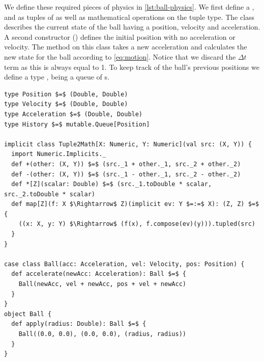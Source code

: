 We define these required pieces of physics in \autoref{lst:ball-physics}. We first define a ,  and  as tuples of  as well as mathematical operations on the tuple type. The  class describes the current state of the ball having a position, velocity and acceleration. A second constructor () defines the initial position with no acceleration or velocity. The method  on this class takes a new acceleration and calculates the new state for the ball according to \autoref{eq:motion}. Notice that we discard the $\Delta t$ term as this is always equal to 1. To keep track of the ball's previous positions we define a type , being a queue of s.

\begin{minipage}{\linewidth}
\begin{lstlisting}[style=ScalaStyle, caption={Ball motion physics}, label={lst:ball-physics}]
type Position $=$ (Double, Double)
type Velocity $=$ (Double, Double)
type Acceleration $=$ (Double, Double)
type History $=$ mutable.Queue[Position]

implicit class Tuple2Math[X: Numeric, Y: Numeric](val src: (X, Y)) {
  import Numeric.Implicits._
  def +(other: (X, Y)) $=$ (src._1 + other._1, src._2 + other._2)
  def -(other: (X, Y)) $=$ (src._1 - other._1, src._2 - other._2)
  def *[Z](scalar: Double) $=$ (src._1.toDouble * scalar, src._2.toDouble * scalar)
  def map[Z](f: X $\Rightarrow$ Z)(implicit ev: Y $=:=$ X): (Z, Z) $=$ {
    ((x: X, y: Y) $\Rightarrow$ (f(x), f.compose(ev)(y))).tupled(src)
  }
}

case class Ball(acc: Acceleration, vel: Velocity, pos: Position) {
  def accelerate(newAcc: Acceleration): Ball $=$ {
    Ball(newAcc, vel + newAcc, pos + vel + newAcc)
  }
}
object Ball {
  def apply(radius: Double): Ball $=$ {
    Ball((0.0, 0.0), (0.0, 0.0), (radius, radius))
  }
}
\end{lstlisting}
\end{minipage}


